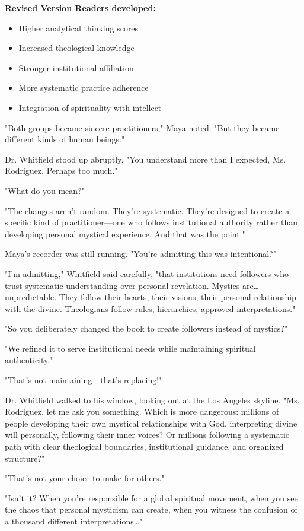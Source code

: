 \documentclass[11pt,twoside]{book}
\begin{document}
\textbf{\textbf{Revised Version Readers developed:}}
\begin{itemize}
\item Higher analytical thinking scores
\item Increased theological knowledge
\item Stronger institutional affiliation
\item More systematic practice adherence
\item Integration of spirituality with intellect
\end{itemize}

"Both groups became sincere practitioners," Maya noted. "But they became different kinds of human beings."

Dr. Whitfield stood up abruptly. "You understand more than I expected, Ms. Rodriguez. Perhaps too much."

"What do you mean?"

"The changes aren't random. They're systematic. They're designed to create a specific kind of practitioner—one who follows institutional authority rather than developing personal mystical experience. And that was the point."

Maya's recorder was still running. "You're admitting this was intentional?"

"I'm admitting," Whitfield said carefully, "that institutions need followers who trust systematic understanding over personal revelation. Mystics are\ldots{} unpredictable. They follow their hearts, their visions, their personal relationship with the divine. Theologians follow rules, hierarchies, approved interpretations."

"So you deliberately changed the book to create followers instead of mystics?"

"We refined it to serve institutional needs while maintaining spiritual authenticity."

"That's not maintaining—that's replacing!"

Dr. Whitfield walked to his window, looking out at the Los Angeles skyline. "Ms. Rodriguez, let me ask you something. Which is more dangerous: millions of people developing their own mystical relationships with God, interpreting divine will personally, following their inner voices? Or millions following a systematic path with clear theological boundaries, institutional guidance, and organized structure?"

"That's not your choice to make for others."

"Isn't it? When you're responsible for a global spiritual movement, when you see the chaos that personal mysticism can create, when you witness the confusion of a thousand different interpretations\ldots{}"
\end{document}
